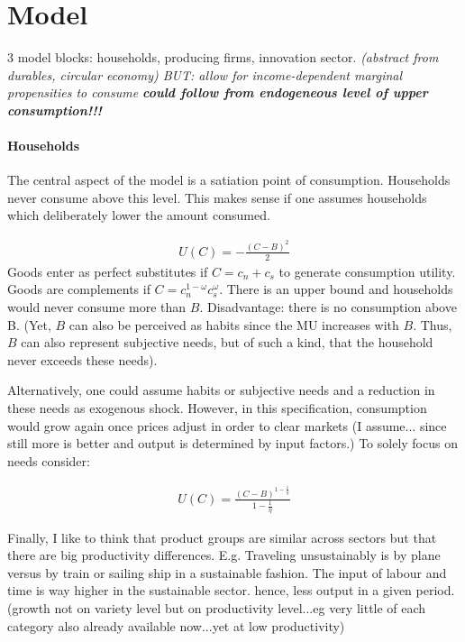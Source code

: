 \section{Model}

3 model blocks: households, producing firms, innovation sector.
\textit{(abstract from durables, circular economy) BUT: allow for income-dependent marginal propensities to consume \textbf{could follow from endogeneous level of upper consumption!!!} }
\paragraph{Households}
The central aspect of the model is a satiation point of consumption. Households never consume above this level. This makes sense if one assumes households which deliberately lower the amount consumed. 

\begin{align*}
U(C)= -\frac{(C-B)^2}{2} 
\end{align*}
Goods enter as perfect substitutes if $C=c_n+c_s$ to generate consumption utility.
Goods are complements if $C=c_n^{1-\omega}c_s^\omega$.
 There is an upper bound and households would never consume more than $B$. Disadvantage: there is no consumption above B.  (Yet, $B$ can also be perceived as habits since the MU increases with $B$. Thus, $B$ can also represent subjective needs, but of such a kind, that the household never exceeds these needs). 


Alternatively, one could assume habits or subjective needs and a reduction in these needs as exogenous shock. However, in this specification, consumption would grow again once prices adjust in order to clear markets (I assume... since still more is better and output is determined by input factors.)
To solely focus on needs consider:

\begin{align*}
	U(C)= \frac{(C-B)^{1-\frac{1}{\eta}}}{1-\frac{1}{\eta}}
\end{align*}


Finally, I like to think that product groups are similar across sectors but that there are big productivity differences. E.g. Traveling unsustainably is by plane versus by train or sailing ship in a sustainable fashion. The input of labour and time is way higher in the sustainable sector. hence, less output in a given period. (growth not on variety level but on productivity level...eg very little of each category also already available now...yet at low productivity)


